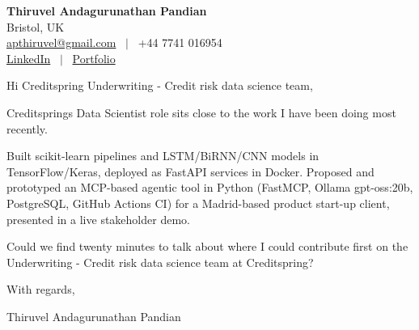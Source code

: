 \documentclass[11pt,a4paper]{article}
\begin{document}
\raggedright
\pagestyle{empty}

\begin{center}
    {\LARGE \color{linkblue} \textbf{Thiruvel Andagurunathan Pandian}}\\[0.2cm]
    Bristol, UK \\
    \href{mailto:apthiruvel@gmail.com}{apthiruvel@gmail.com} \ $|$ \ +44 7741 016954 \\
\href{https://www.linkedin.com/in/thiruvel-a-p/}{LinkedIn} \ $|$ \ \href{https://thiruvel-ap.github.io/PersonalPortfolio/}{Portfolio}
\end{center}

\vspace{0.4cm}

\noindent
Hi Creditspring Underwriting - Credit risk data science team,

Creditspring\textquotesingle{}s Data Scientist role sits close to the work I have been doing most recently.

Built scikit-learn pipelines and LSTM/BiRNN/CNN models in TensorFlow/Keras, deployed as FastAPI services in Docker. Proposed and prototyped an MCP-based agentic tool in Python (FastMCP, Ollama gpt-oss:20b, PostgreSQL, GitHub Actions CI) for a Madrid-based product start-up client, presented in a live stakeholder demo.

Could we find twenty minutes to talk about where I could contribute first on the Underwriting - Credit risk data science team at Creditspring?

\vspace{0.5cm}

With regards,

Thiruvel Andagurunathan Pandian
\end{document}
